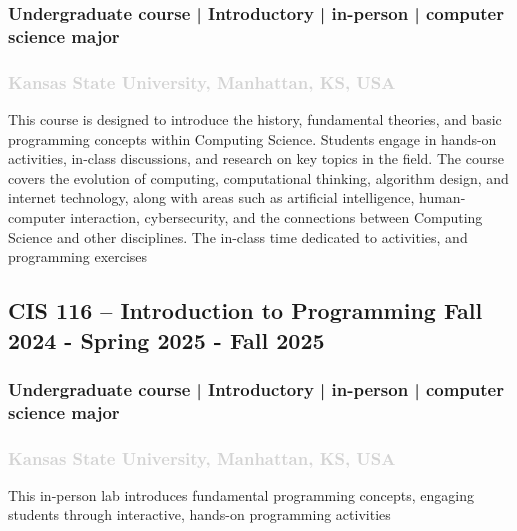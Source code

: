 \documentclass[11pt]{article}
\begin{document}
   \subsubsection{ Undergraduate course | Introductory |  in-person | computer science major   }
  \subsubsection{ \normalfont \textcolor{lightgray}{Kansas State University, Manhattan, KS, USA   }}
     \vspace{0.4em} %
      \noindent
This course is designed to introduce the history, fundamental theories, and basic programming concepts within Computing Science. Students engage in hands-on activities, in-class discussions, and research on key topics in the field. The course covers the evolution of computing, computational thinking, algorithm design, and internet technology, along with areas such as artificial intelligence, human-computer interaction, cybersecurity, and the connections between Computing Science and other disciplines. The in-class time dedicated to activities, and programming exercises

\label{sec:CIS116} 
   \vspace{0.8em} %
   
    \subsection{ CIS 116 – Introduction to Programming   \hfill \normalfont Fall 2024 - Spring 2025 - Fall 2025}
     \subsubsection{ Undergraduate course | Introductory |  in-person | computer science major   }
  \subsubsection{ \normalfont \textcolor{lightgray}{Kansas State University, Manhattan, KS, USA   }}
      \vspace{0.4em} %
       \noindent
This in-person lab introduces fundamental programming concepts, engaging students through interactive, hands-on programming activities


\label{sec:CC315} 
   \vspace{0.8em} %
   
\end{document}
